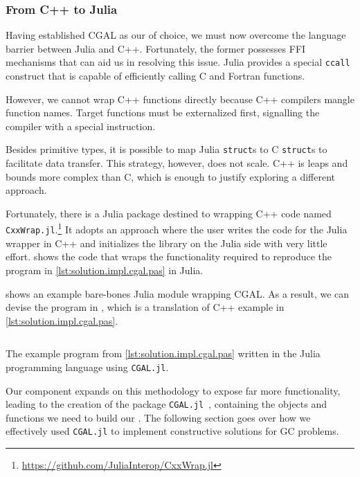 \subsubsection{From C++ to Julia}%
\label{sec:solution.impl.jlcgal}

Having established \ac{CGAL} as our \geomlibrary{} of choice, we must now
overcome the language barrier between Julia and C++.  Fortunately, the former
possesses \ac{FFI} mechanisms that can aid us in resolving this issue.  Julia
provides a special \texttt{ccall} construct that is capable of
efficiently calling C and Fortran functions.

However, we cannot wrap C++ functions directly because C++ compilers mangle
function names.  Target functions must be externalized first, signalling the
compiler with a special instruction.

Besides primitive types, it is possible to map Julia \texttt{struct}s
to C \texttt{struct}s to facilitate data transfer.  This strategy,
however, does not scale.  C++ is leaps and bounds more complex than C, which is
enough to justify exploring a different approach.

Fortunately, there is a Julia package destined to wrapping C++ code named
\texttt{CxxWrap.jl}.\footnote{\url{https://github.com/JuliaInterop/CxxWrap.jl}}
It adopts an approach where the user writes the code for the Julia wrapper in
C++ and initializes the library on the Julia side with very little effort.
 shows the code that wraps the
functionality required to reproduce the program in
\cref{lst:solution.impl.cgal.pas} in Julia.

 shows an example bare-bones Julia module
wrapping \ac{CGAL}.  As a result, we can devise the program in
, which is a translation of C++ example in
\cref{lst:solution.impl.cgal.pas}.

\begin{listing}[htbp]
  \inputminted{julia}{jl/points_and_segments.jl}
  \caption{\label{lst:solution.impl.jlcgal.pas}
    The example program from \cref{lst:solution.impl.cgal.pas} written in the
    Julia programming language using \texttt{CGAL.jl}.}%
\end{listing}

Our \wrapper{} component expands on this methodology to expose far more
functionality, leading to the creation of the package
\texttt{CGAL.jl}~\cite{Ventura:2021:CGAL.jl},  containing the objects and
functions we need to build our \primitives{}.  The following section goes over
how we effectively used \texttt{CGAL.jl} to implement constructive solutions for
\ac{GC} problems.

